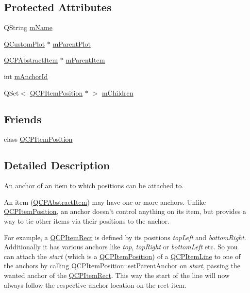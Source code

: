 \subsection*{Protected Attributes}
\begin{DoxyCompactItemize}
\item 
Q\-String \hyperlink{class_q_c_p_item_anchor_a23ad4d0ab0d2cbb41a7baf05bcf996ec}{m\-Name}
\item 
\hyperlink{class_q_custom_plot}{Q\-Custom\-Plot} $\ast$ \hyperlink{class_q_c_p_item_anchor_a59b968410831ba91a25cc75a77dde6f5}{m\-Parent\-Plot}
\item 
\hyperlink{class_q_c_p_abstract_item}{Q\-C\-P\-Abstract\-Item} $\ast$ \hyperlink{class_q_c_p_item_anchor_a80fad480ad3bb980446ed6ebc00818ae}{m\-Parent\-Item}
\item 
int \hyperlink{class_q_c_p_item_anchor_a00c62070333e8345976b579676ad3997}{m\-Anchor\-Id}
\item 
Q\-Set$<$ \hyperlink{class_q_c_p_item_position}{Q\-C\-P\-Item\-Position} $\ast$ $>$ \hyperlink{class_q_c_p_item_anchor_a5f0e67f395a63e2dd0e29ff1dcaf37b7}{m\-Children}
\end{DoxyCompactItemize}
\subsection*{Friends}
\begin{DoxyCompactItemize}
\item 
class \hyperlink{class_q_c_p_item_anchor_aa9b8ddc062778e202a0be06a57d18d17}{Q\-C\-P\-Item\-Position}
\end{DoxyCompactItemize}


\subsection{Detailed Description}
An anchor of an item to which positions can be attached to. 

An item (\hyperlink{class_q_c_p_abstract_item}{Q\-C\-P\-Abstract\-Item}) may have one or more anchors. Unlike \hyperlink{class_q_c_p_item_position}{Q\-C\-P\-Item\-Position}, an anchor doesn't control anything on its item, but provides a way to tie other items via their positions to the anchor.

For example, a \hyperlink{class_q_c_p_item_rect}{Q\-C\-P\-Item\-Rect} is defined by its positions {\itshape top\-Left} and {\itshape bottom\-Right}. Additionally it has various anchors like {\itshape top}, {\itshape top\-Right} or {\itshape bottom\-Left} etc. So you can attach the {\itshape start} (which is a \hyperlink{class_q_c_p_item_position}{Q\-C\-P\-Item\-Position}) of a \hyperlink{class_q_c_p_item_line}{Q\-C\-P\-Item\-Line} to one of the anchors by calling \hyperlink{class_q_c_p_item_position_ac094d67a95d2dceafa0d50b9db3a7e51}{Q\-C\-P\-Item\-Position\-::set\-Parent\-Anchor} on {\itshape start}, passing the wanted anchor of the \hyperlink{class_q_c_p_item_rect}{Q\-C\-P\-Item\-Rect}. This way the start of the line will now always follow the respective anchor location on the rect item.


